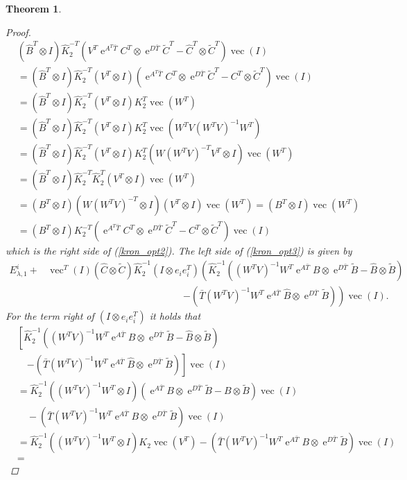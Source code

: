 \documentclass[a4paper,11pt, twoside]{article}
\newcommand{\expn}{\operatorname{e}}
\newcommand{\vect}{\operatorname{vec}}
\newtheorem{thm}[defn]{Theorem}
\begin{document}
\begin{thm}
\begin{proof}
\begin{equation}
\begin{aligned}
&(\hat B^T\otimes I) \hat K_2^{-T}(V^T\expn^{A^T \bar T} C^T \otimes \expn^{D \bar T}\tilde C^T-\hat C^T 
\otimes \tilde C^T)\vect(I)\\&=(\hat B^T\otimes I) \hat K_2^{-T} (V^T\otimes I) (\expn^{A^T \bar T} C^T \otimes \expn^{D \bar T}\tilde C^T-C^T 
\otimes \tilde C^T)\vect(I)\\&=(\hat B^T\otimes I) \hat K_2^{-T} (V^T\otimes I) K_2^T\vect(W^T)\\&=(\hat B^T\otimes I) \hat K_2^{-T} (V^T\otimes I) 
K_2^T\vect(W^TV(W^TV)^{-1}W^T)\\&= (\hat B^T\otimes I) \hat K_2^{-T} (V^T\otimes I) K_2^T(W(W^TV)^{-T}V^T\otimes I)\vect(W^T)\\&= (\hat B^T\otimes I) 
\hat K_2^{-T} \hat K_2^T(V^T\otimes I)\vect(W^T)\\&= (B^T\otimes I) (W(W^TV)^{-T}\otimes I) (V^T\otimes I)\vect(W^T)=(B^T\otimes I) 
\vect(W^T)\\&=(B^T\otimes I)K_2^{-T} (\expn^{A^T \bar T} C^T \otimes \expn^{D \bar T}\tilde C^T-C^T \otimes \tilde C^T)\vect(I) 
\end{aligned}\end{equation}           
 which is the right side of (\ref{kron_opt2}).  The left side of (\ref{kron_opt3}) is given by
 \begin{align*} 
   E_{\lambda, 1}^i+&\vect^T(I) (\hat C \otimes \tilde C) \hat K_2^{-1} (I\otimes e_i e_i^T) \left(\hat K_2^{-1}  
((W^TV)^{-1}W^T\expn^{A \bar T} B \otimes \expn^{D \bar T}\tilde B -\hat B \otimes \tilde 
B)\right.\\&\quad\quad\quad\quad\quad\quad\quad\quad\quad\quad\quad\quad\quad\quad\left.-(\bar T(W^TV)^{-1}W^T \expn^{A \bar T}\hat B \otimes 
\expn^{D \bar T}\tilde B)\right)\vect(I).
\end{align*}          
For the term right of $(I\otimes e_i e_i^T)$ it holds that \begin{align*} 
 &\left[\hat K_2^{-1}  ((W^TV)^{-1}W^T\expn^{A \bar T} B \otimes \expn^{D \bar T}\tilde B -\hat B \otimes \tilde 
B)\right.\\&\quad\left.-(\bar T(W^TV)^{-1}W^T \expn^{A \bar T}\hat B \otimes \expn^{D \bar T}\tilde B)\right]\vect(I)\\&= 
 \hat K_2^{-1} ((W^TV)^{-1}W^T\otimes I)  (\expn^{A \bar T} B \otimes \expn^{D \bar T}\tilde B - B \otimes \tilde 
B)\vect(I)\\&\quad-(\bar T (W^TV)^{-1}W^T \expn^{A \bar T} B \otimes \expn^{D \bar T}\tilde B)\vect(I) \\&= 
 \hat K_2^{-1} ((W^TV)^{-1}W^T\otimes I) K_2 \vect(V^T)-(\bar T (W^TV)^{-1}W^T \expn^{A \bar T} B \otimes \expn^{D \bar T}\tilde B)\vect(I)\\&= 

\end{align*}
\end{proof}
\end{thm}
\end{document}
